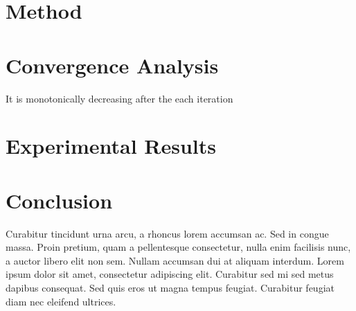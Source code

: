 \documentclass{article}
\begin{document}
\section{Method} 



\section{Convergence Analysis}
It is monotonically decreasing after the each iteration

\section{Experimental Results}

\section{Conclusion} 
Curabitur tincidunt urna arcu, a rhoncus lorem accumsan ac. Sed in congue massa. Proin pretium, quam a pellentesque consectetur, nulla enim facilisis nunc, a auctor libero elit non sem. Nullam accumsan dui at aliquam interdum. Lorem ipsum dolor sit amet, consectetur adipiscing elit. Curabitur sed mi sed metus dapibus consequat. Sed quis eros ut magna tempus feugiat. Curabitur feugiat diam nec eleifend ultrices.



\clearpage


\end{document}
